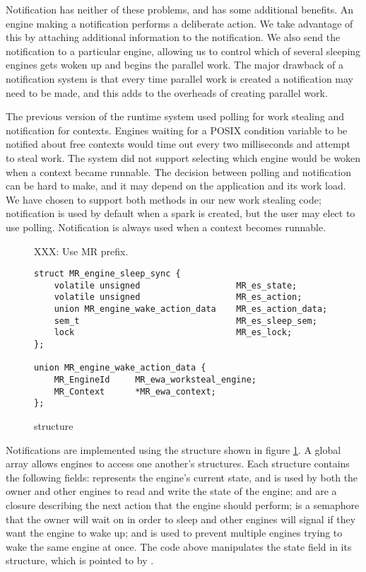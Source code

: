 Notification has neither of these problems, and has some additional
benefits.
An engine making a notification performs a deliberate action.
We take advantage of this by attaching additional information to the
notification.
We also send the notification to a particular engine,
allowing us to control which of several sleeping engines gets woken up and
begins the parallel work.
The major drawback of a notification system is that every time parallel work
is created a notification may need to be made,
and this adds to the overheads of creating parallel work.

The previous version of the runtime system used polling for work
stealing and notification for contexts.
Engines waiting for a POSIX condition variable to be notified about free
contexts would time out every two milliseconds and attempt to steal work.
The system did not support selecting which engine would be woken when a
context became runnable.
The decision between polling and notification can be hard to make,
and it may depend on the application and its work load. 
We have chosen to support both methods in our new work stealing code;
notification is used by default when a spark is created,
but the user may elect to use polling.
Notification is always used when a context becomes runnable. 

\begin{figure}
XXX: Use MR prefix.
\begin{verbatim}
struct MR_engine_sleep_sync {
    volatile unsigned                   MR_es_state;
    volatile unsigned                   MR_es_action;
    union MR_engine_wake_action_data    MR_es_action_data;
    sem_t                               MR_es_sleep_sem;
    lock                                MR_es_lock;
};

union MR_engine_wake_action_data {
    MR_EngineId     MR_ewa_worksteal_engine;
    MR_Context      *MR_ewa_context;
};
\end{verbatim}
\caption{\enginesleepsync structure}
\label{fig:engine_sleep_sync}
\end{figure}

Notifications are implemented using the \enginesleepsync structure shown in
figure \ref{fig:engine_sleep_sync}.
A global array allows engines to access one another's \enginesleepsync
structures.
Each structure contains the following fields:
 represents the engine's current state,
and is used by both the owner and other engines to read and write the state
of the engine;
 and  are a closure describing
the next action that the engine should perform;
 is a semaphore that the owner will wait on in order to
sleep and other engines will signal if they want the engine to wake up;
and  is used to prevent multiple engines trying to wake the same
engine at once.
The \idle code above manipulates the state field in its structure,
which is pointed to by .

